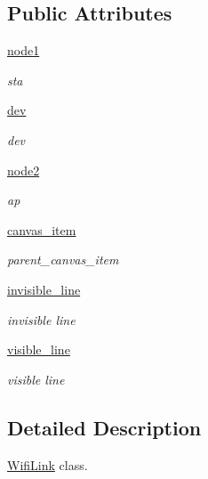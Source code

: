 \subsection*{Public Attributes}
\begin{DoxyCompactItemize}
\item 
\hyperlink{classwifi__intrastructure__link_1_1WifiLink_a09f701c48feb76a7326cd9ab0c9e9ef9}{node1}
\begin{DoxyCompactList}\small\item\em sta \end{DoxyCompactList}\item 
\hyperlink{classwifi__intrastructure__link_1_1WifiLink_a08172890e1ead1ce5c3e03eaa166634a}{dev}
\begin{DoxyCompactList}\small\item\em dev \end{DoxyCompactList}\item 
\hyperlink{classwifi__intrastructure__link_1_1WifiLink_ae2a6891c2b8c472b6125b5414b0be1ca}{node2}
\begin{DoxyCompactList}\small\item\em ap \end{DoxyCompactList}\item 
\hyperlink{classwifi__intrastructure__link_1_1WifiLink_a45fdec8fed6b8aa9d749bfe55485d49e}{canvas\+\_\+item}
\begin{DoxyCompactList}\small\item\em parent\+\_\+canvas\+\_\+item \end{DoxyCompactList}\item 
\hyperlink{classwifi__intrastructure__link_1_1WifiLink_adc2c71fbcb45b36e9f03b7150e6868fa}{invisible\+\_\+line}
\begin{DoxyCompactList}\small\item\em invisible line \end{DoxyCompactList}\item 
\hyperlink{classwifi__intrastructure__link_1_1WifiLink_a93c4314f7e592781ef343014db420842}{visible\+\_\+line}
\begin{DoxyCompactList}\small\item\em visible line \end{DoxyCompactList}\end{DoxyCompactItemize}


\subsection{Detailed Description}
\hyperlink{classwifi__intrastructure__link_1_1WifiLink}{Wifi\+Link} class. 

